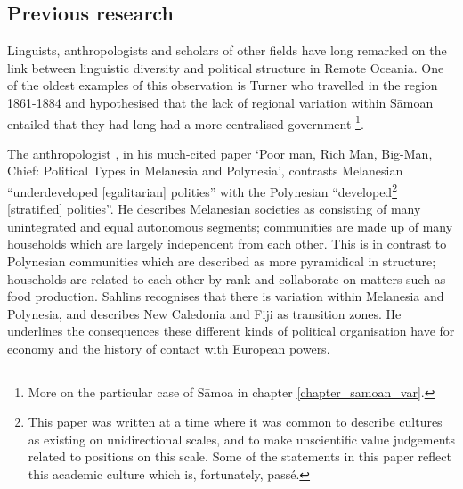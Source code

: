 \documentclass[a4paper,10pt]{article} %
\begin{document}

 
 
\subsection{Previous research}
\label{nonlingfactors}
Linguists, anthropologists and scholars of other fields have long remarked on the link between linguistic diversity and political structure in Remote Oceania. One of the oldest examples of this observation is Turner who travelled in the region 1861-1884 and hypothesised that the lack of regional variation within S\={a}moan entailed that they had long had a more centralised government \citep[172]{turner1884}\footnote{More on the particular case of S\={a}moa in chapter \ref{chapter_samoan_var}.}.


The anthropologist \citet{sahlins63}, in his much-cited paper `Poor man, Rich Man, Big-Man, Chief: Political Types in Melanesia and Polynesia', contrasts Melanesian ``underdeveloped [egalitarian] polities'' with the Polynesian ``developed\footnote{This paper was written at a time where it was common to describe cultures as existing on unidirectional scales, and to make unscientific value judgements related to positions on this scale. Some of the statements in this paper reflect this academic culture which is, fortunately, passé.} [stratified] polities''. He describes Melanesian societies as consisting of many unintegrated and equal autonomous segments; communities are made up of many households which are largely independent from each other. This is in contrast to Polynesian communities which are described as more pyramidical in structure; households are related to each other by rank and collaborate on matters such as food production. Sahlins recognises that there is variation within Melanesia and Polynesia, and describes New Caledonia and Fiji as transition zones. He underlines the consequences these different kinds of political organisation have for economy and the history of contact with European powers.%
\end{document}
